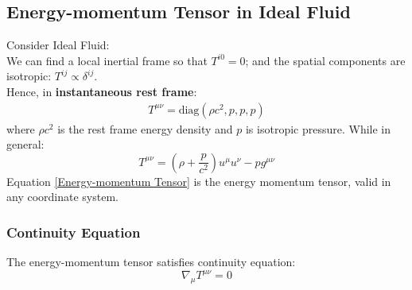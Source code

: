 \documentclass[12pt,a4paper]{article}
\begin{document}
    \subsection{Energy-momentum Tensor in Ideal Fluid}
        Consider Ideal Fluid:\\
        We can find a local inertial frame so that $T^{i0}=0$; and the spatial components are isotropic: $T^{ij}\propto\delta^{ij}$.\\
        Hence, in \textbf{instantaneous rest frame}:
        \begin{align*}
            T^{\mu\nu}= \text{diag}(\rho c^2,p,p,p)
        \end{align*}
        where $\rho c^2$ is the rest frame energy density and $p$ is isotropic pressure.
        While in general:
        \begin{equation}\label{Energy-momentum Tensor}
            T^{\mu\nu}= (\rho+\dfrac{p}{c^2})u^\mu u^\nu - pg^{\mu\nu}
        \end{equation}
        Equation \ref{Energy-momentum Tensor} is the energy momentum tensor, valid in any coordinate system.\\
        \subsubsection{Continuity Equation}
        The energy-momentum tensor satisfies continuity equation:
        \begin{equation*}
            \nabla_\mu T^{\mu\nu} = 0
        \end{equation*}
\end{document}
